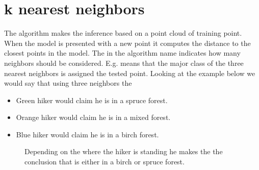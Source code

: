 \documentclass[letterpaper,10pt,english]{sphinxmanual}
\begin{document}
\section{k nearest neighbors}
\label{\detokenize{ML4NeutronImageSegmentation:k-nearest-neighbors}}
The  algorithm makes the inference based on a point cloud of training point. When the model is presented with a new point it computes the distance to the closest points in the model. The  in the algorithm name indicates how many neighbors should be considered. E.g.  means that the major class of the three nearest neighbors is assigned the tested point. Looking at the example below we would say that using three neighbors the
\begin{itemize}
\item {} 
Green hiker would claim he is in a spruce forest.

\item {} 
Orange hiker would claim he is in a mixed forest.

\item {} 
Blue hiker would claim he is in a birch forest.

\end{itemize}

\begin{figure}[htbp]
\centering
\capstart

\noindent{}
\caption{Depending on the where the hiker is standing he makes the the conclusion that is either in a birch or spruce forest.}\label{\detokenize{ML4NeutronImageSegmentation:id16}}\end{figure}
\end{document}
